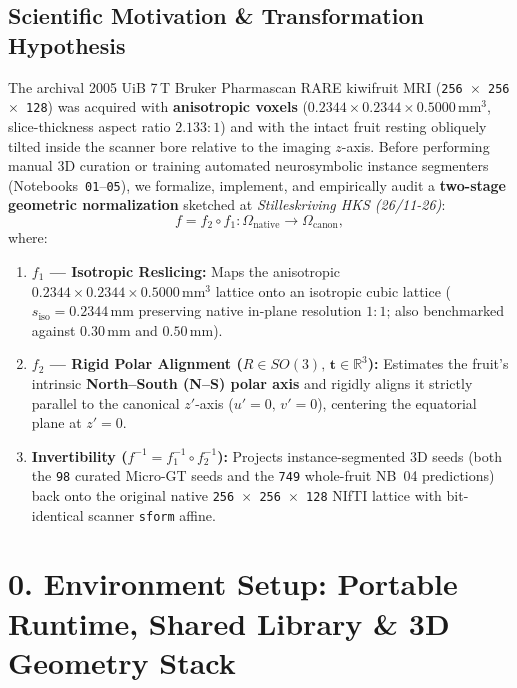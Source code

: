 \documentclass[10pt,a4paper]{article}
\renewcommand{\_}{\origunderscore\allowbreak}
\begin{document}
\subsection*{Scientific Motivation \& Transformation Hypothesis}
The archival 2005 UiB 7\,T Bruker Pharmascan RARE kiwifruit MRI (\texttt{256 $\times$ 256 $\times$ 128}) was acquired with \textbf{anisotropic voxels} ($0.2344 \times 0.2344 \times 0.5000\,\text{mm}^3$, slice-thickness aspect ratio $2.133:1$) and with the intact fruit resting obliquely tilted inside the scanner bore relative to the imaging $z$-axis. Before performing manual 3D curation or training automated neurosymbolic instance segmenters (Notebooks~\texttt{01}--\texttt{05}), we formalize, implement, and empirically audit a \textbf{two-stage geometric normalization} sketched at \textit{Stilleskriving HKS (26/11-26)}:
\[
f = f_2 \circ f_1 : \Omega_{\text{native}} \longrightarrow \Omega_{\text{canon}},
\]
where:
\begin{enumerate}
    \item \textbf{$f_1$ --- Isotropic Reslicing:} Maps the anisotropic $0.2344 \times 0.2344 \times 0.5000\,\text{mm}^3$ lattice onto an isotropic cubic lattice ($s_{\text{iso}} = 0.2344\,\text{mm}$ preserving native in-plane resolution $1:1$; also benchmarked against $0.30\,\text{mm}$ and $0.50\,\text{mm}$).
    \item \textbf{$f_2$ --- Rigid Polar Alignment ($R \in SO(3),\,\mathbf{t} \in \mathbb{R}^3$):} Estimates the fruit's intrinsic \textbf{North--South (N--S) polar axis} and rigidly aligns it strictly parallel to the canonical $z'$-axis ($u' = 0,\, v' = 0$), centering the equatorial plane at $z' = 0$.
    \item \textbf{Invertibility ($f^{-1} = f_1^{-1} \circ f_2^{-1}$):} Projects instance-segmented 3D seeds (both the \texttt{98} curated Micro-GT seeds and the \texttt{749} whole-fruit NB~04 predictions) back onto the original native \texttt{256 $\times$ 256 $\times$ 128} NIfTI lattice with bit-identical scanner \texttt{sform} affine.
\end{enumerate}

\section*{0. Environment Setup: Portable Runtime, Shared Library \& 3D Geometry Stack}
\end{document}
